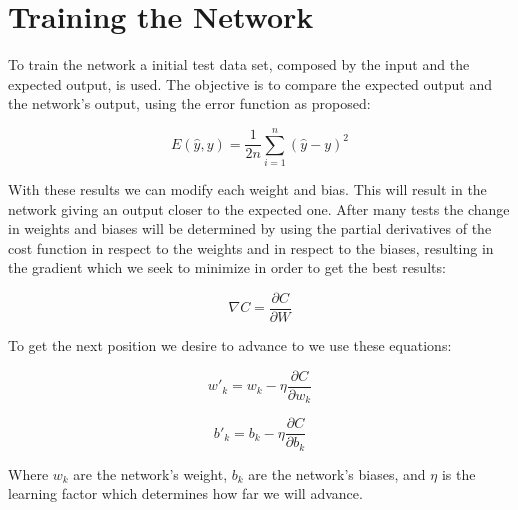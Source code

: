 \documentclass[a4paper, 12pts]{amsart}
\begin{document}
\section{Training the Network}
To train the network a initial test data set, composed by the input and the expected output, is used. The objective is to compare the expected output and the network's output, using the error function as proposed:

\[E(\hat{y}, y) = \frac{1}{2n}\sum_{i=1}^{n} (\hat{y}-y)^2\]


With these results we can modify each weight and bias. This will result in the network giving an output closer to the expected one. After many tests the change in weights and biases will be determined by using the partial derivatives of the cost function in respect to the weights and in respect to the biases, resulting in the gradient which we seek to minimize in order to get the best results:

\[\nabla C = \frac{\partial C}{\partial W}\]

To get the next position we desire to advance to we use these equations:

\[ w'_k = w_k - \eta\frac{\partial C}{\partial w_k}\]


\[b'_k = b_k - \eta\frac{\partial C}{\partial b_k}\]

Where $w_k$ are the network's weight, $b_k$ are the network's biases, and $\eta$ is the learning factor which determines how far we will advance.
\end{document}

